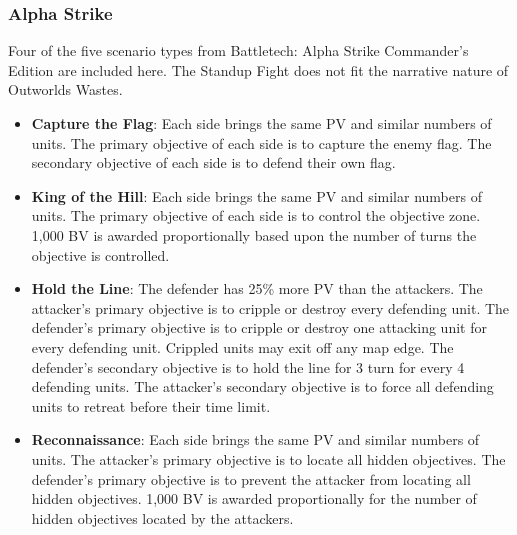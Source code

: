 \documentclass[UTF8]{article}
\begin{document}
\newpage

\subsubsection{Alpha Strike}

Four of the five scenario types from Battletech: Alpha Strike Commander's Edition are included here.
The Standup Fight does not fit the narrative nature of Outworlds Wastes.\\

\begin{itemize}

\item {\bf Capture the Flag}: Each side brings the same PV and similar numbers of units.
The primary objective of each side is to capture the enemy flag.
The secondary objective of each side is to defend their own flag.

\item {\bf King of the Hill}: Each side brings the same PV and similar numbers of units.
The primary objective of each side is to control the objective zone.
1,000 BV is awarded proportionally based upon the number of turns the objective is controlled.

\item {\bf Hold the Line}: The defender has 25\% more PV than the attackers.
The attacker's primary objective is to cripple or destroy every defending unit.
The defender's primary objective is to cripple or destroy one attacking unit for every defending unit.
Crippled units may exit off any map edge.
The defender's secondary objective is to hold the line for 3 turn for every 4 defending units.
The attacker's secondary objective is to force all defending units to retreat before their time limit.

\item {\bf Reconnaissance}: Each side brings the same PV and similar numbers of units.
The attacker's primary objective is to locate all hidden objectives.
The defender's primary objective is to prevent the attacker from locating all hidden objectives.
1,000 BV is awarded proportionally for the number of hidden objectives located by the attackers.

\end{itemize}
\end{document}
